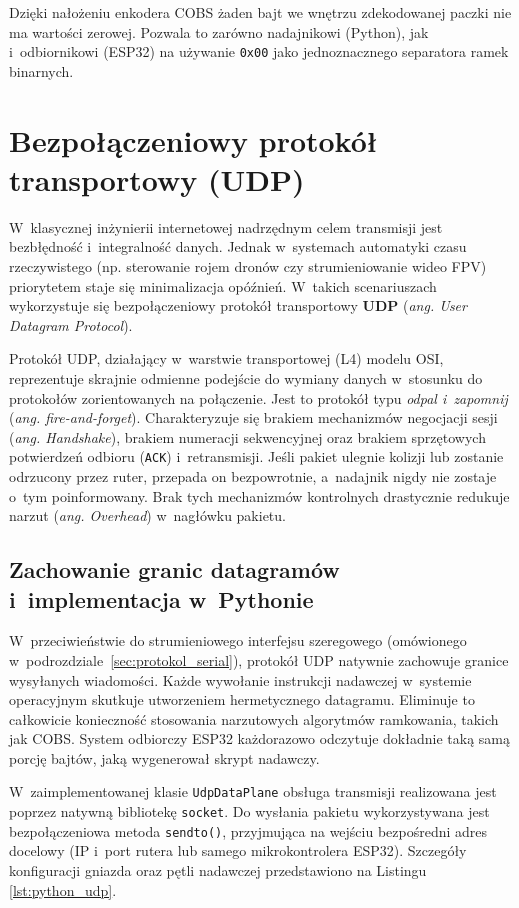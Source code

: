 Dzięki nałożeniu enkodera COBS żaden bajt we wnętrzu zdekodowanej paczki nie ma wartości zerowej.
Pozwala to zarówno nadajnikowi (Python), jak i~odbiornikowi (ESP32) na używanie \texttt{0x00} jako jednoznacznego separatora ramek binarnych.

\section{Bezpołączeniowy protokół transportowy (UDP)}
\label{sec:protokol_udp}

W~klasycznej inżynierii internetowej nadrzędnym celem transmisji jest bezbłędność i~integralność danych.
Jednak w~systemach automatyki czasu rzeczywistego (np. sterowanie rojem dronów czy strumieniowanie wideo FPV) priorytetem staje się minimalizacja opóźnień.
W~takich scenariuszach wykorzystuje się bezpołączeniowy protokół transportowy \textbf{UDP} (\textit{ang. User Datagram Protocol}).

Protokół UDP, działający w~warstwie transportowej (L4) modelu OSI, reprezentuje skrajnie odmienne podejście do wymiany danych w~stosunku do protokołów zorientowanych na połączenie.
Jest to protokół typu \textit{odpal i~zapomnij} (\textit{ang. fire-and-forget}).
Charakteryzuje się brakiem mechanizmów negocjacji sesji (\textit{ang. Handshake}), brakiem numeracji sekwencyjnej oraz brakiem sprzętowych potwierdzeń odbioru (\texttt{ACK}) i~retransmisji.
Jeśli pakiet ulegnie kolizji lub zostanie odrzucony przez ruter, przepada on bezpowrotnie, a~nadajnik nigdy nie zostaje o~tym poinformowany.
Brak tych mechanizmów kontrolnych drastycznie redukuje narzut (\textit{ang. Overhead}) w~nagłówku pakietu.

\subsection{Zachowanie granic datagramów i~implementacja w~Pythonie}

W~przeciwieństwie do strumieniowego interfejsu szeregowego (omówionego w~podrozdziale~\ref{sec:protokol_serial}), protokół UDP natywnie zachowuje granice wysyłanych wiadomości.
Każde wywołanie instrukcji nadawczej w~systemie operacyjnym skutkuje utworzeniem hermetycznego datagramu.
Eliminuje to całkowicie konieczność stosowania narzutowych algorytmów ramkowania, takich jak COBS.
System odbiorczy ESP32 każdorazowo odczytuje dokładnie taką samą porcję bajtów, jaką wygenerował skrypt nadawczy.

W~zaimplementowanej klasie \texttt{UdpDataPlane} obsługa transmisji realizowana jest poprzez natywną bibliotekę \texttt{socket}.
Do wysłania pakietu wykorzystywana jest bezpołączeniowa metoda \texttt{sendto()}, przyjmująca na wejściu bezpośredni adres docelowy (IP i~port rutera lub samego mikrokontrolera ESP32).
Szczegóły konfiguracji gniazda oraz pętli nadawczej przedstawiono na Listingu \ref{lst:python_udp}.

